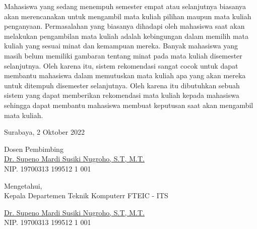 Mahasiswa yang sedang menempuh semester empat atau selanjutnya biasanya akan merencanakan
untuk mengambil mata kuliah pilihan maupun mata kuliah penganyaan. Permasalahan yang biasanya dihadapi oleh mahasiswa
saat akan melakukan pengambilan mata kuliah adalah kebingungan dalam memilih mata kuliah
yang sesuai minat dan kemampuan mereka. Banyak mahasiswa yang masih belum memiliki gambaran
tentang minat pada mata kuliah disemester selanjutnya. Oleh karena itu, sistem rekomendasi
sangat cocok untuk dapat membantu mahasiswa dalam memutuskan mata kuliah apa yang akan mereka
untuk ditempuh disemester selanjutnya. Oleh karena itu dibutuhkan sebuah sistem yang dapat memberikan
rekomendasi mata kuliah kepada mahasiswa sehingga dapat membantu mahasiswa membuat keputusan saat akan
mengambil mata kuliah.
\vspace{1ex}

\begin{flushright}
  Surabaya, 2 Oktober 2022
\end{flushright}
\vspace{1ex}

\begin{center}







  Dosen Pembimbing \\
  \vspace{12ex}
  \underline{Dr. Supeno Mardi Susiki Nugroho, S.T, M.T.} \\
  NIP. 19700313 199512 1 001

  \vspace{6ex}

  Mengetahui, \\
  Kepala Departemen Teknik Komputerr FTEIC - ITS
  \vspace{12ex}

  \underline{Dr. Supeno Mardi Susiki Nugroho, S.T, M.T.} \\
  NIP. 19700313 199512 1 001

\end{center}
